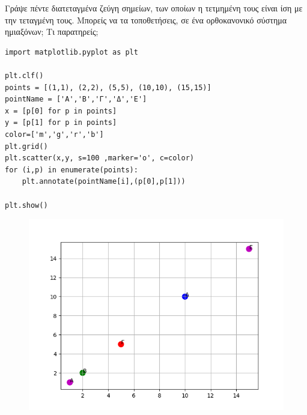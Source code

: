 \begin{exercise}
Γράψε πέντε διατεταγμένα ζεύγη σημείων, των οποίων η τετμημένη τους είναι ίση με
την τεταγμένη τους. Μπορείς να τα
τοποθετήσεις, σε ένα ορθοκανονικό
σύστημα ημιαξόνων; Τι παρατηρείς;
\end{exercise}
\begin{lstlisting}
import matplotlib.pyplot as plt

plt.clf()
points = [(1,1), (2,2), (5,5), (10,10), (15,15)]
pointName = ['Α','Β','Γ','Δ','Ε']
x = [p[0] for p in points]
y = [p[1] for p in points]
color=['m','g','r','b']
plt.grid()
plt.scatter(x,y, s=100 ,marker='o', c=color)
for (i,p) in enumerate(points):
    plt.annotate(pointName[i],(p[0],p[1]))

plt.show()
\end{lstlisting}
\begin{figure}
\includegraphics{graph3.png}
\end{figure}

